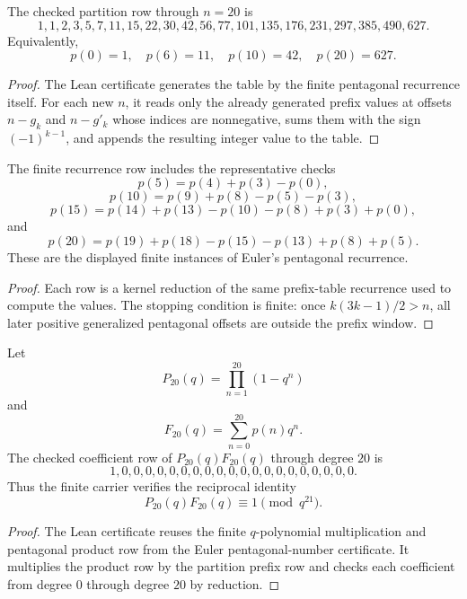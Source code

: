 \begin{theorem}
\label{thm:partition-pentagonal-recurrence-value-certificate}
The checked partition row through $n=20$ is
$$
1,1,2,3,5,7,11,15,22,30,42,56,77,101,135,176,231,297,385,490,627.
$$
Equivalently,
$$
p(0)=1,\quad p(6)=11,\quad p(10)=42,\quad p(20)=627.
$$
\end{theorem}
\begin{proof}
The Lean certificate generates the table by the finite pentagonal recurrence itself. For each new $n$, it reads only the already generated prefix values at offsets $n-g_k$ and $n-g'_k$ whose indices are nonnegative, sums them with the sign $(-1)^{k-1}$, and appends the resulting integer value to the table.
\end{proof}

\begin{theorem}
\label{thm:partition-pentagonal-recurrence-euler-recurrence-certificate}
The finite recurrence row includes the representative checks
$$
p(5)=p(4)+p(3)-p(0),
$$
$$
p(10)=p(9)+p(8)-p(5)-p(3),
$$
$$
p(15)=p(14)+p(13)-p(10)-p(8)+p(3)+p(0),
$$
and
$$
p(20)=p(19)+p(18)-p(15)-p(13)+p(8)+p(5).
$$
These are the displayed finite instances of Euler's pentagonal recurrence.
\end{theorem}
\begin{proof}
Each row is a kernel reduction of the same prefix-table recurrence used to compute the values. The stopping condition is finite: once $k(3k-1)/2>n$, all later positive generalized pentagonal offsets are outside the prefix window.
\end{proof}

\begin{theorem}
\label{thm:partition-pentagonal-recurrence-reciprocal-certificate}
Let
$$
P_{20}(q)=\prod_{n=1}^{20}(1-q^n)
$$
and
$$
F_{20}(q)=\sum_{n=0}^{20}p(n)q^n.
$$
The checked coefficient row of $P_{20}(q)F_{20}(q)$ through degree $20$ is
$$
1,0,0,0,0,0,0,0,0,0,0,0,0,0,0,0,0,0,0,0,0.
$$
Thus the finite carrier verifies the reciprocal identity
$$
P_{20}(q)F_{20}(q)\equiv 1 \pmod {q^{21}}.
$$
\end{theorem}
\begin{proof}
The Lean certificate reuses the finite $q$-polynomial multiplication and pentagonal product row from the Euler pentagonal-number certificate. It multiplies the product row by the partition prefix row and checks each coefficient from degree $0$ through degree $20$ by reduction.
\end{proof}

